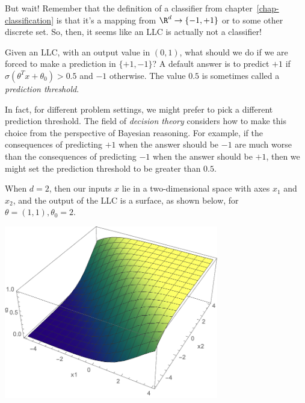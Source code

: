 But wait!  Remember that the definition of a classifier from
chapter~\ref{chap-classification} is that it's a mapping from $\R^d
\rightarrow \{-1, +1\}$ or to some other discrete set.  So, then, it
seems like an LLC is actually not a classifier! 

Given an LLC, with an output value in $(0, 1)$, what should we do if
we are forced to make a prediction in $\{+1, -1\}$?  A default answer
is to predict $+1$ if $\sigma(\theta^T x + \theta_0) > 0.5$ and $-1$
otherwise.  The value $0.5$ is sometimes called a {\em prediction
  threshold}.

In fact, for different problem settings, we might prefer to pick a
different prediction threshold.  The field of {\em decision theory}
considers how to make this choice from the perspective of Bayesian
reasoning.  For example, if the consequences of predicting $+1$ when
the answer should be $-1$ are much worse than the consequences of
predicting $-1$ when the answer should be $+1$, then we might set the
prediction threshold to be greater than $0.5$.


When $d = 2$, then our inputs $x$ lie in a two-dimensional space with
axes $x_1$ and $x_2$, and the output of the LLC is a surface, as shown
below, for $\theta = (1, 1), \theta_0 = 2$.

\includegraphics[width=0.7\textwidth]{figures/logreg3d}


